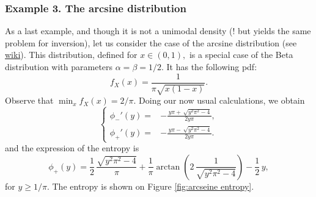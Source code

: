 \documentclass[english,onecolumn]{elsarticle}
\begin{document}
\subsubsection{Example 3. The arcsine distribution}

As a last example, and though it is not a unimodal density (! but
yields the same problem for inversion), let us consider the case of
the arcsine distribution (see \href{http://en.wikipedia.org/wiki/Arcsine_distribution}{wiki}).
This distribution, defined for $x\in(0,1),$ is a special case of
the Beta distribution with parameters $\alpha=\beta=1/2.$ It has
the following pdf:
\[
f_{X}(x)=\frac{1}{\pi\sqrt{x(1-x)}}.
\]
Observe that $\min_{x}f_{X}(x)=2/\pi.$ Doing our now usual calculations,
we obtain
\[
\begin{cases}
\phi_{-}'(y)= & -\frac{\, y\pi+\,\sqrt{{y}^{2}{\pi}^{2}-4}}{2y\pi},\\
\phi_{+}'(y)= & -\frac{\, y\pi-\,\sqrt{{y}^{2}{\pi}^{2}-4}}{2y\pi}.
\end{cases}
\]
and the expression of the entropy is 
\[
\phi_{+}(y)=\frac{1}{2}\,{\frac{\sqrt{{y}^{2}{\pi}^{2}-4}}{\pi}}+\frac{1}{\pi}\arctan\left(2\,{\frac{1}{\sqrt{{y}^{2}{\pi}^{2}-4}}}\right)-\frac{1}{2}\, y,
\]
for $y\geq1/\pi$. The entropy is shown on Figure \ref{fig:arcseine entropy}.
\begin{figure}
\end{figure}
\end{document}
